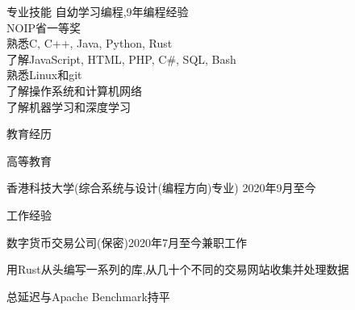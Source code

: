 \documentclass[UTF8]{resume} %
\begin{document}
\begin{rSection}{专业技能}
    自幼学习编程,9年编程经验\\
    NOIP省一等奖\\
    熟悉C, C++, Java, Python, Rust\\
    了解JavaScript, HTML, PHP, C\#, SQL, Bash\\
    熟悉Linux和git\\
    了解操作系统和计算机网络\\
    了解机器学习和深度学习
\end{rSection}

\begin{rSection}{教育经历}
    \begin{rSubsection}{高等教育}{}{}{}
        \item 香港科技大学(综合系统与设计(编程方向)专业) \hfill 2020年9月至今
    \end{rSubsection}
\end{rSection}

\begin{rSection}{工作经验}
    \begin{rSubsection}{数字货币交易公司(保密)}{2020年7月至今}{兼职工作}{}
        \item 用Rust从头编写一系列的库,从几十个不同的交易网站收集并处理数据
        \item 总延迟与Apache Benchmark持平
    \end{rSubsection}
\end{rSection}
\end{document}
